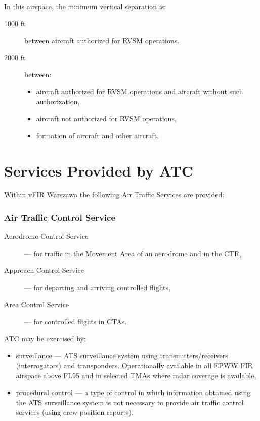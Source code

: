 In this airspace, the minimum vertical separation is:
\begin{description}
    \item[1000 ft] between aircraft authorized for RVSM operations.
    \item[2000 ft] between:
    \begin{itemize}
        \item aircraft authorized for RVSM operations and aircraft without such authorization,
        \item aircraft not authorized for RVSM operations,
        \item formation of aircraft and other aircraft.
    \end{itemize} 
\end{description}

\clearpage%
\section{Services Provided by ATC}%
\label{sect:airspace:services}

Within vFIR Warszawa the following Air Traffic Services are provided:
\subsubsection{Air Traffic Control Service}
\begin{description}
    \item[Aerodrome Control Service] --- for traffic in the Movement Area of an aerodrome and in the CTR,
    \item[Approach Control Service] --- for departing and arriving controlled flights,
    \item[Area Control Service] --- for controlled flights in CTAs. 
\end{description}

ATC may be exercised by:
\begin{itemize}
    \item surveillance --- ATS surveillance system using transmitters/receivers (interrogators) and transponders. Operationally available in all EPWW FIR airspace above FL95 and in selected TMAs where radar coverage is available,
    \item procedural control --- a type of control in which information obtained using the ATS surveillance system is not necessary to provide air traffic control services (using crew position reports).
\end{itemize}


